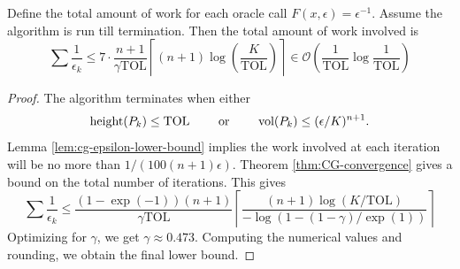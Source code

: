 \begin{thm} \label{thm:cg-total-work}
Define the total amount of work for each oracle call $F(x,\epsilon) = \epsilon^{-1}$. Assume the algorithm is run till termination. Then the total amount of work involved is
\[
\sum{\frac{1}{\epsilon_{k}}}\leq7\cdot\frac{n+1}{\gamma \mbox{TOL}}\left\lceil (n+1)\log\left(\frac{K}{\mbox{TOL}}\right)\right\rceil \in\mathcal{O}\left(\frac{1}{\mbox{TOL}}\log\frac{1}{\mbox{TOL}}\right)
\]
\end{thm}
\begin{proof}
The algorithm terminates when either
$$
\mbox{height}(P_k)\leq \mbox{TOL} \qquad \mbox{ or }\qquad\textnormal{vol}(P_k)\leq(\epsilon/K)^{n+1} .
$$
Lemma \ref{lem:cg-epsilon-lower-bound} implies the work involved at each
iteration will be no more than $1/(100(n+1)\epsilon)$. Theorem \ref{thm:CG-convergence} gives a bound on the total number of iterations. This gives
\[
\sum {\frac{1}{\epsilon_k}} 
\leq \frac{(1-\exp(-1))(n+1)}{\gamma\mbox{TOL}}
\left\lceil \frac{(n+1)\log(K/\mbox{TOL})}{-\log(1-(1-\gamma)/\exp(1))} \right\rceil
\]
Optimizing for $\gamma$, we get $\gamma \approx 0.473$. Computing the numerical
values and rounding, we obtain the final lower bound.
\end{proof}

